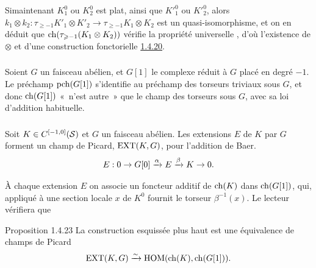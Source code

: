 \documentclass[10pt]{../fichiers-configuration-latex/smfart}
\begin{document}
Si\pageoriginale maintenant $K^0_{1}$ ou $K^0_{2}$ est plat,
ainsi que ${K'}^0_{1}$ ou ${K'}^0_{2}$, alors
$k_{1}\otimes k_{2}:\tau_{\geq -1}{K'}_{1}\otimes {K'}_{2}\rightarrow
\tau_{\geq -1}K_{1}\otimes K_{2}$ est un quasi-isomorphisme, et on en
déduit que $\operatorname{ch}(\tau_{\geqslant -1}(K_{1}\otimes K_{2}))$ vérifie la
propriété universelle , d'où l'existence de $\otimes$ et
d'une construction fonctorielle \hyperref[XVIII.const1.4.20]{1.4.20}. 

\setcounter{subsubsection}{20}
\subsubsection{}
Soient $G$ un faisceau
abélien, et $G[1]$ le complexe réduit à $G$ placé en degré $-1$. Le
préchamp $\operatorname{pch}(G[1])$ s'identifie au préchamp des torseurs triviaux
sous $G$, et donc $\operatorname{ch}(G[1])$ « n'est autre »  que le champ des
torseurs sous $G$, avec sa loi d'addition habituelle.

\subsubsection{}
Soit $K\in C^{[-1,0]}({\mathcal S})$ et $G$ un faisceau abélien. Les
extensions $E$ de $K$ par $G$ forment un champ de Picard, $\operatorname{EXT}(K,G)$,
pour l'addition de Baer.
$$
E:0\rightarrow
G[0]\xrightarrow{\alpha}E\xrightarrow{\beta}K\rightarrow 0{}.
$$

À chaque extension $E$ on associe un foncteur additif de $\operatorname{ch}(K)$ dans
$\operatorname{ch}(G[1])$, qui, appliqué à une section locale $x$ de $K^{0}$ fournit
le torseur $\beta^{-1}(x)$. Le lecteur vérifiera que

\begin{enonce*}{Proposition 1.4.23}
La construction esquissée plus haut est une équivalence de champs de
Picard
$$
\operatorname{EXT}(K,G)\xrightarrow{\sim} \operatorname{HOM}(\operatorname{ch}(K),\operatorname{ch}(G[1])){}.
$$
\end{enonce*}

\setcounter{subsubsection}{23}
\end{document}
